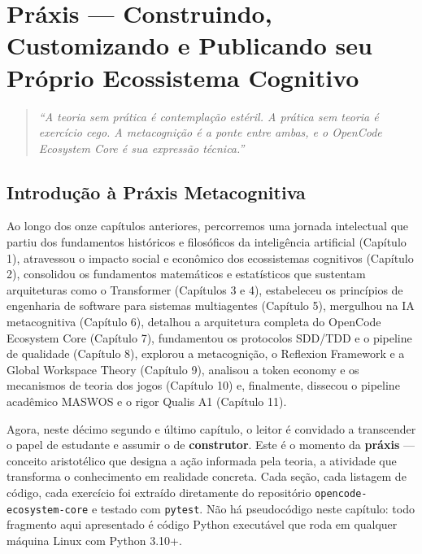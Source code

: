 
\chapter{Práxis — Construindo, Customizando e Publicando seu Próprio Ecossistema Cognitivo}
\label{chap:praxis}

\begin{quote}
\textit{``A teoria sem prática é contemplação estéril. A prática sem teoria é exercício cego. A metacognição é a ponte entre ambas, e o OpenCode Ecosystem Core é sua expressão técnica.''}
\end{quote}

\section{Introdução à Práxis Metacognitiva}
\label{sec:praxis-intro}

Ao longo dos onze capítulos anteriores, percorremos uma jornada intelectual que partiu dos fundamentos históricos e filosóficos da inteligência artificial (Capítulo 1), atravessou o impacto social e econômico dos ecossistemas cognitivos (Capítulo 2), consolidou os fundamentos matemáticos e estatísticos que sustentam arquiteturas como o Transformer (Capítulos 3 e 4), estabeleceu os princípios de engenharia de software para sistemas multiagentes (Capítulo 5), mergulhou na IA metacognitiva (Capítulo 6), detalhou a arquitetura completa do OpenCode Ecosystem Core (Capítulo 7), fundamentou os protocolos SDD/TDD e o pipeline de qualidade (Capítulo 8), explorou a metacognição, o Reflexion Framework e a Global Workspace Theory (Capítulo 9), analisou a token economy e os mecanismos de teoria dos jogos (Capítulo 10) e, finalmente, dissecou o pipeline acadêmico MASWOS e o rigor Qualis A1 (Capítulo 11).

Agora, neste décimo segundo e último capítulo, o leitor é convidado a transcender o papel de estudante e assumir o de \textbf{construtor}. Este é o momento da \textbf{práxis} — conceito aristotélico que designa a ação informada pela teoria, a atividade que transforma o conhecimento em realidade concreta. Cada seção, cada listagem de código, cada exercício foi extraído diretamente do repositório \texttt{opencode-ecosystem-core} e testado com \texttt{pytest}. Não há pseudocódigo neste capítulo: todo fragmento aqui apresentado é código Python executável que roda em qualquer máquina Linux com Python 3.10+.


